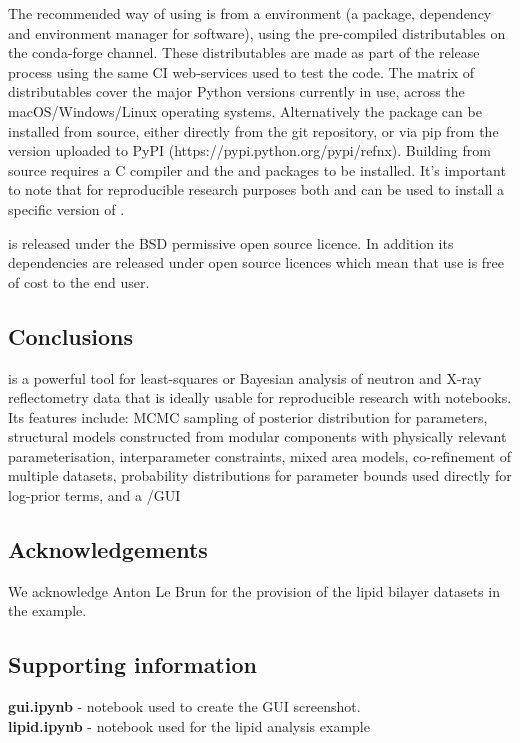 \documentclass[12pt]{article}
\begin{document}
 The recommended way of using  is from a \conda environment (a package, dependency and environment manager for software), using the pre-compiled distributables on the  conda-forge channel. These distributables are made as part of the release process using the same CI web-services used to test the code. The matrix of distributables cover the major Python versions currently in use, across the macOS/Windows/Linux operating systems. Alternatively the package can be installed from source, either directly from the git repository, or via pip from the version uploaded to PyPI (https://pypi.python.org/pypi/refnx). Building from source requires a C compiler and the \Cython and \NumPy packages to be installed. It's important to note that for reproducible research purposes both \conda and \pip can be used to install a specific version of .
 
 is released under the BSD permissive open source licence. In addition its dependencies are released under open source licences which mean that use is free of cost to the end user.

\subsection*{Conclusions}\label{conclusions}
 is a powerful tool for least-squares or Bayesian analysis of neutron and X-ray reflectometry data that is ideally usable for reproducible research with \Jupyter notebooks. Its features include: MCMC sampling of posterior distribution for parameters, structural models constructed from modular components with physically relevant parameterisation, interparameter constraints, mixed area models, co-refinement of multiple datasets, probability distributions for parameter bounds used directly for log-prior terms, and a \Jupyter/\ipywidgets GUI

\subsection*{Acknowledgements}
We acknowledge Anton Le Brun for the provision of the lipid bilayer datasets in the example.

\subsection*{Supporting information}
\textbf{gui.ipynb} - \Jupyter notebook used to create the GUI screenshot.\\
\textbf{lipid.ipynb} - \Jupyter notebook used for the lipid analysis example

{}

\end{document}
